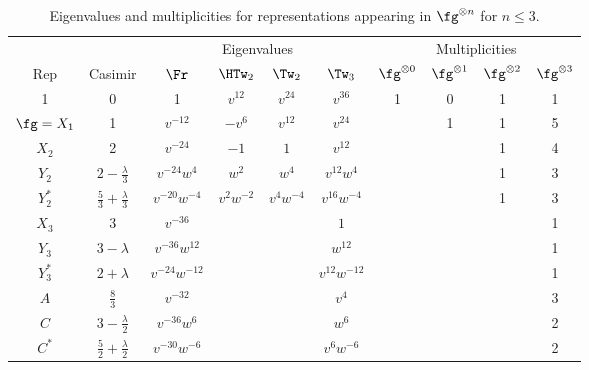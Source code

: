 \documentclass[12pt]{amsart}
\begin{document}
\begin{table}
  \centering
\medskip
\begin{tabular}{cccccccccc}
  \toprule
      &         &   \multicolumn{4}{c}{Eigenvalues}    & \multicolumn{4}{c}{Multiplicities} \\
  \cmidrule(lr){3-6} \cmidrule(l){7-10}
  Rep & Casimir & $\Fr$ & $\HTw_2$ & $\Tw_2$ & $\Tw_3$ & $\fg^{\otimes0}$ & $\fg^{\otimes1}$ & $\fg^{\otimes2}$ & $\fg^{\otimes3}$\\ \midrule
  1   & 0       & 1     & $v^{12}$ & $v^{24}$ & $v^{36}$
      & 1 & 0 & 1 & 1\\[3pt]
  $\fg=X_1$ & 1 & $v^{-12}$ & $-v^6$ & $v^{12}$ & $v^{24}$
      &   & 1 & 1 & 5\\[3pt]
  $X_2$ & 2     & $v^{-24}$ & $-1$ & $1$      & $v^{12}$
      &   &   & 1 & 4\\[3pt]
  $Y_2$ & $2 - \frac{\lambda}{3}$ & $v^{-24}w^4$ & $w^2$ & $w^4$ & $v^{12}w^4$
      &   &   & 1 & 3\\[3pt]
  $Y_2^*$ & $\frac{5}{3} + \frac{\lambda}{3}$ & $v^{-20}w^{-4}$ & $v^2 w^{-2}$ & $v^4 w^{-4}$ & $v^{16}w^{-4}$
      &   &   & 1 & 3\\[3pt]
  $X_3$ & $3$ & $v^{-36}$ & & & $1$ &&&& 1\\[3pt]
  $Y_3$ & $3 - \lambda$ & $v^{-36}w^{12}$ &&& $w^{12}$ &&&& 1\\[3pt]
  $Y_3^*$ & $2 + \lambda$ & $v^{-24}w^{-12}$ &&& $v^{12}w^{-12}$ &&&& 1\\[3pt]
  $A$ & $\frac{8}{3}$ & $v^{-32}$ &&& $v^4$ &&&& 3\\[3pt]
  $C$ & $3 - \frac{\lambda}{2}$ & $v^{-36}w^6$ &&& $w^6$ &&&& 2\\[3pt]
  $C^*$ & $\frac{5}{2} + \frac{\lambda}{2}$ & $v^{-30}w^{-6}$ &&& $v^6w^{-6}$ &&&& 2\\[3pt]
  \bottomrule
\end{tabular}
\medskip
\caption{Eigenvalues and multiplicities for representations appearing in $\fg^{\otimes n}$ for $n \le 3$.}
\label{tab:e-vals}
\end{table}
\end{document}
